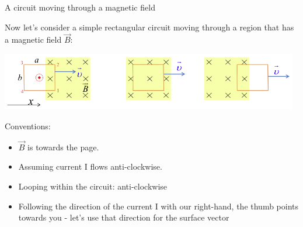 %
%
%

\begin{frame}{A circuit moving through a magnetic field}

Now let's consider a simple rectangular circuit moving through a region that has a magnetic field $\vec{B}$:
\begin{center}
  \includegraphics[width=0.98\textwidth]{./images/schematics/circuit_moving_through_magnetic_field_all_3.png}\\
\end{center}

Conventions:
\begin{itemize}
  \item $\vec{B}$ is towards the page.
  \item Assuming current I flows anti-clockwise.
  \item Looping within the circuit: anti-clockwise
  \item Following the direction of the current I with our right-hand, the thumb points towards you -
        let's use that direction for the surface vector
\end{itemize}

\end{frame}

%
%
%

